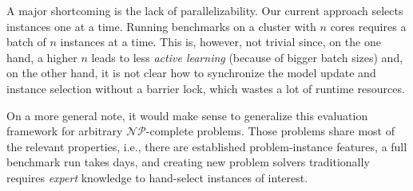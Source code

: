 \documentclass[runningheads]{llncs}
\begin{document}
A major shortcoming is the lack of parallelizability.
Our current approach selects instances one at a time.
Running benchmarks on a cluster with $n$ cores requires a batch of $n$ instances at a time.
This is, however, not trivial since, on the one hand, a higher $n$ leads to less \textit{active learning} (because of bigger batch sizes) and, on the other hand, it is not clear how to synchronize the model update and instance selection without a barrier lock, which wastes a lot of runtime resources.

On a more general note, it would make sense to generalize this evaluation framework for arbitrary $\mathcal{NP}$-complete problems.
Those problems share most of the relevant properties, i.e., there are established problem-instance features, a full benchmark run takes days, and creating new problem solvers traditionally requires \textit{expert} knowledge to hand-select instances of interest.


%
%


\end{document}
